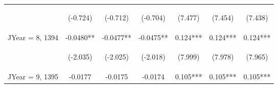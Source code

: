 \documentclass[]{article}
\begin{document}
\begin{center}
\begin{tabular}{lcccccc}
        \vspace{4pt}     & \begin{footnotesize}(-0.724)\end{footnotesize} & \begin{footnotesize}(-0.712)\end{footnotesize} & \begin{footnotesize}(-0.704)\end{footnotesize} & \begin{footnotesize}(7.477)\end{footnotesize}  & \begin{footnotesize}(7.454)\end{footnotesize}  & \begin{footnotesize}(7.438)\end{footnotesize}  \\
        JYear = 8, 1394  & -0.0480**                                      & -0.0477**                                      & -0.0475**                                      & 0.124***                                       & 0.124***                                       & 0.124***                                       \\
        \vspace{4pt}     & \begin{footnotesize}(-2.035)\end{footnotesize} & \begin{footnotesize}(-2.025)\end{footnotesize} & \begin{footnotesize}(-2.018)\end{footnotesize} & \begin{footnotesize}(7.999)\end{footnotesize}  & \begin{footnotesize}(7.978)\end{footnotesize}  & \begin{footnotesize}(7.965)\end{footnotesize}  \\
        JYear = 9, 1395  & -0.0177                                        & -0.0175                                        & -0.0174                                        & 0.105***                                       & 0.105***                                       & 0.105***                                       \\

\end{tabular}
\end{center}
\end{document}
